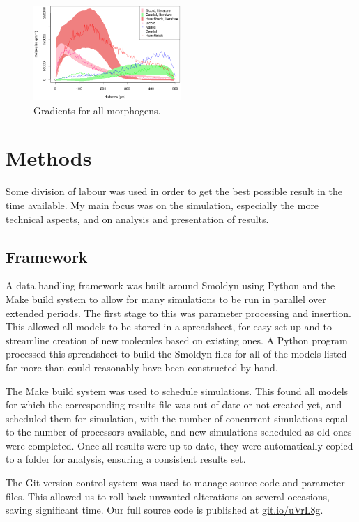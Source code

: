 \documentclass[11pt,a4paper,twocolumn]{article}
\begin{document}
\begin{figure}[h!]
  \centering
    \includegraphics[width=0.5\textwidth]{writeup-all}
  \caption{Gradients for all morphogens. \label{fig:all}}
\end{figure}

\section{Methods}
Some division of labour was used in order to get the best possible result in the time available. My main focus was on the simulation, especially the more technical aspects, and on analysis and presentation of results.

\subsection{Framework}
A data handling framework was built around Smoldyn using Python and the Make build system to allow for many simulations to be run in parallel over extended periods. The first stage to this was parameter processing and insertion. This allowed all models to be stored in a spreadsheet, for easy set up and to streamline creation of new molecules based on existing ones. A Python program processed this spreadsheet to build the Smoldyn files for all of the models listed - far more than could reasonably have been constructed by hand. 

The Make build system was used to schedule simulations. This found all models for which the corresponding results file was out of date or not created yet, and scheduled them for simulation, with the number of concurrent simulations equal to the number of processors available, and new simulations scheduled as old ones were completed. Once all results were up to date, they were automatically copied to a folder for analysis, ensuring a consistent results set.

The Git version control system was used to manage source code and parameter files. This allowed us to roll back unwanted alterations on several occasions, saving significant time. Our full source code is published at \url{git.io/uVrL8g}.
\end{document}
